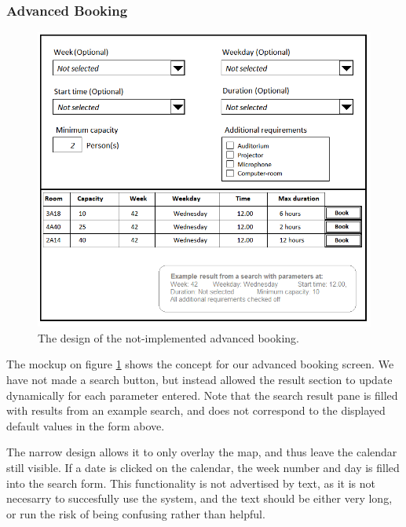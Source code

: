 \subsubsection*{Advanced Booking}
\begin{figure}[htb]
\begin{center}
\leavevmode
\includegraphics[width=1\textwidth]{images/advanced_mockup}
\end{center}
\caption{The design of the not-implemented advanced booking.}
\label{fig:advanced_mockup}
\end{figure}
The mockup on figure \ref{fig:advanced_mockup} shows the concept for our advanced booking screen. We have not made a search button, but instead allowed the result section to update dynamically for each parameter entered.
Note that the search result pane is filled with results from an example search, and does not correspond to the displayed default values in the form above.

The narrow design allows it to only overlay the map, and thus leave the calendar still visible. 
If a date is clicked on the calendar, the week number and day is filled into the search form. This functionality is not advertised by text, as it is not necesarry to succesfully use the system, and the text should be either very long, or run the risk of being confusing rather than helpful.\cite{steve}

\pagebreak
